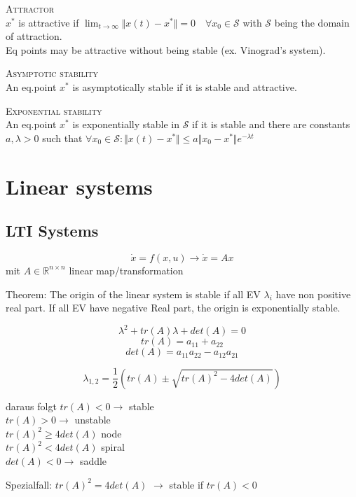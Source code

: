 \textsc{Attractor}\\
$x^*$ is attractive if $\lim_{t\rightarrow \infty} \Vert x(t)-x^* \Vert = 0 \quad \forall x_0 \in \mathcal{S}$ with $\mathcal{S}$ being the domain of attraction.\\
Eq points may be attractive without being stable (ex. Vinograd's system).

\textsc{Asymptotic stability}\\
An eq.point $x^*$ is asymptotically stable if it is stable and attractive.

\textsc{Exponential stability}\\
An eq.point $x^*$ is exponentially stable in $\mathcal{S}$ if it is stable and there are constants $a, \lambda > 0$ such that $\forall x_0 \in \mathcal{S}: \Vert x(t)-x^*\Vert \leq a\Vert x_0 - x^* \Vert e^{-\lambda t}$

\section{Linear systems}
\subsection{LTI Systems}
\[ \dot{x} = f(x,u) \rightarrow \dot{x} = Ax \]
mit $A \in \mathbb{R}^{n \times n}$ linear map/transformation

Theorem:
The origin of the linear system is stable if all EV $\lambda_i$ have non positive real part. If all EV have negative Real part, the origin is exponentially stable.

\[ \lambda^2+tr(A)\lambda+det(A) = 0 \]
\[ tr(A) = a_{11} + a_{22} \]
\[ det(A) = a_{11}a_{22} - a_{12}a_{21} \]

\[ \lambda_{1,2} = \frac{1}{2} \left( tr(A) \pm \sqrt{tr(A)^2-4det(A)}\right) \]

daraus folgt
$tr(A) < 0 \rightarrow$ stable\\
$tr(A) > 0 \rightarrow$ unstable\\
$tr(A)^2 \geq 4det(A)$ node\\
$tr(A)^2 < 4det(A)$ spiral\\
$det(A) < 0 \rightarrow$ saddle

Spezialfall:
$tr(A)^2 = 4det(A)$ $\rightarrow$ stable if $tr(A) < 0$\\



